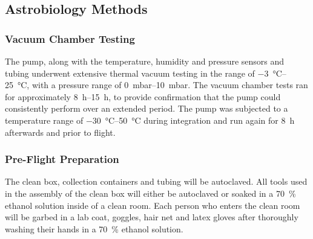 \subsection{Astrobiology Methods}
\label{sec:Astrobiology Methods}

\subsubsection{Vacuum Chamber Testing}


The pump, along with the temperature, humidity and pressure sensors and tubing underwent extensive thermal vacuum testing in the range of \SIrange{-3}{25}{\celsius}, with a pressure range of \SIrange{0}{10}{\milli\bar}. The vacuum chamber tests ran for approximately \SIrange{8}{15}{\hour}, to provide confirmation that the pump could consistently perform over an extended period. The pump was subjected to a temperature range of \SIrange{-30}{50}{\celsius} during integration and run again for \SI{8}{\hour} afterwards and prior to flight.


\subsubsection{Pre-Flight Preparation}


The clean box, collection containers and tubing will be autoclaved. All tools used in the assembly of the clean box will either be autoclaved or soaked in a \SI{70}{\percent} ethanol solution inside of a clean room. Each person who enters the clean room will be garbed in a lab coat, goggles, hair net and latex gloves after thoroughly washing their hands in a \SI{70}{\percent} ethanol solution. 





